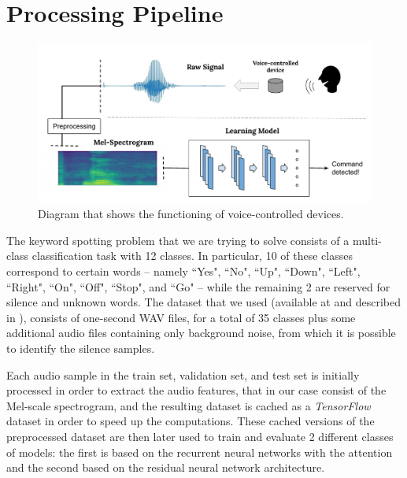 

\section{Processing Pipeline}
\label{sec:processing_architecture}

\begin{figure}[htbp]
\centerline{\includegraphics[scale=.6]{processing_pipeline.pdf}}
\caption{Diagram that shows the functioning of voice-controlled devices.}
\label{fig}
\end{figure}
 

The keyword spotting problem that we are trying to solve consists of a multi-class classification task with 12 classes. In particular, 10 of these classes correspond to certain words -- namely ``Yes", ``No", ``Up", ``Down", ``Left", ``Right", ``On", ``Off", ``Stop", and ``Go" -- while the remaining 2 are reserved for silence and unknown words.
The dataset that we used (available at \cite{5} and described in \cite{4}), consists of one-second WAV files, for a total of 35 classes plus some additional audio files containing only background noise, from which it is possible to identify the silence samples.


Each audio sample in the train set, validation set, and test set is initially processed in order to extract the audio features, that in our case consist of the Mel-scale spectrogram, and the resulting dataset is cached as a \textit{TensorFlow} dataset in order to speed up the computations.
These cached versions of the preprocessed dataset are then later used to train and evaluate 2 different classes of models: the first is based on the recurrent neural networks with the attention and the second based on the residual neural network architecture.


